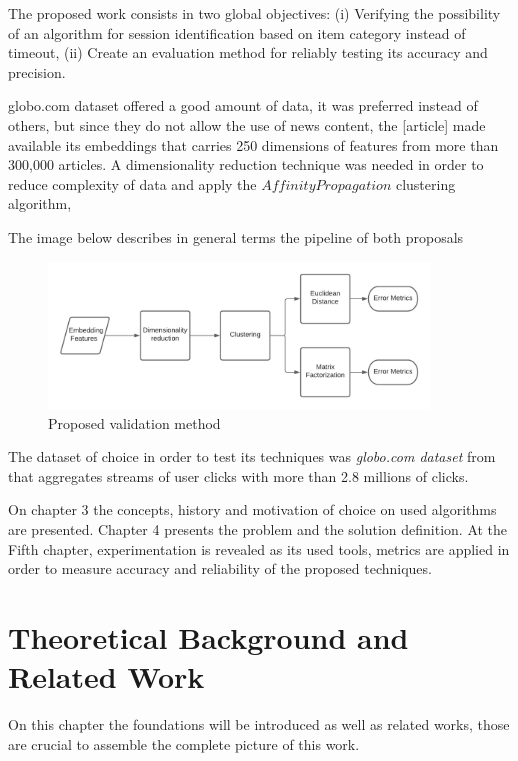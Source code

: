 \documentclass[ecp,tc,english]{iiufrgs}
\begin{document}


The proposed work consists in two global objectives: (i) Verifying the possibility of an algorithm for session identification based on item category instead of timeout, 
(ii) Create an evaluation method for reliably testing its accuracy and precision.

globo.com dataset offered a good amount of data, it was preferred instead of others, but since they do not allow the use of news content, the [article] made available its embeddings that carries 250 dimensions of features from more than 300,000 articles. A dimensionality reduction technique was needed in order to reduce complexity of data and apply the \(Affinity Propagation\) clustering algorithm,

The image below describes in general terms the pipeline of both proposals

\begin{figure}[!ht]
    \centering
    \includegraphics[width=0.9\textwidth]{images/experiment.png}
    \caption{Proposed validation method}
    \label{fig:method_architecture}
\end{figure}

The dataset of choice in order to test its techniques was  \textit{globo.com dataset} from \cite{deSouzaPereiraMoreira:2018:CDL:3240323.3240331} 
that aggregates streams of user clicks with more than 2.8 millions of clicks.

On chapter 3 the concepts, history and motivation of choice on used algorithms are presented. Chapter 4 presents the problem and the solution definition.
At the Fifth chapter, experimentation is revealed as its used tools, metrics are applied in order to measure accuracy and reliability of the proposed techniques.


\chapter{Theoretical Background and Related Work}
On this chapter the foundations will be introduced as well as related works, those are crucial to assemble the complete picture of this work.
\end{document}
